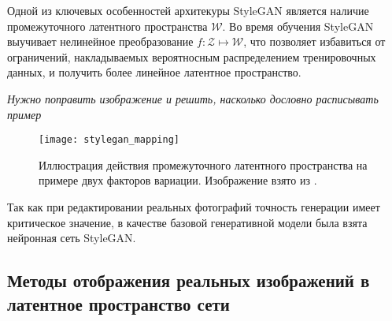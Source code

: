 
Одной из ключевых особенностей архитекуры StyleGAN является наличие промежуточного латентного пространства $\mathcal W$. Во время обучения StyleGAN выучивает нелинейное преобразование $f: \mathcal Z \mapsto \mathcal W$, что позволяет избавиться от ограничений, накладываемых вероятносным распределением тренировочных данных, и получить более линейное латентное пространство.


\emph{Нужно поправить изображение и решить, насколько дословно расписывать пример}

\begin{figure}[h]
\begin{center}
    \texttt{[image: stylegan\_mapping]}
    \caption{Иллюстрация действия промежуточного латентного пространства на примере двух факторов вариации. Изображение взято из \cite{StyleGAN}.}
    \label{fig:stylegan-mapping}
\end{center}
\end{figure}

Так как при редактировании реальных фотографий точность генерации имеет критическое значение, в качестве базовой генеративной модели была взята нейронная сеть StyleGAN.

\subsection{Методы отображения реальных изображений в латентное пространство сети}

